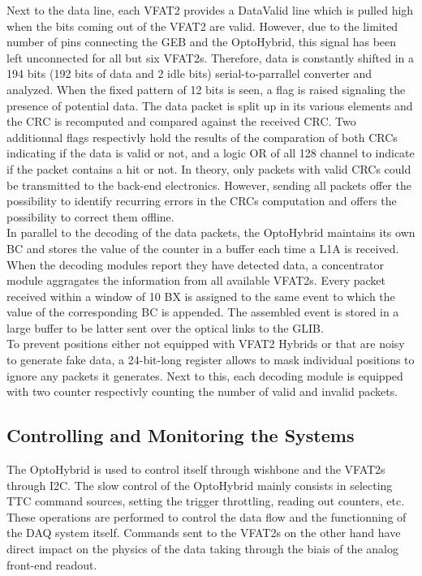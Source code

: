       Next to the data line, each VFAT2 provides a DataValid line which is pulled high when the bits coming out of the VFAT2 are valid. However, due to the limited number of pins connecting the GEB and the OptoHybrid, this signal has been left unconnected for all but six VFAT2s. Therefore, data is constantly shifted in a 194 bits (192 bits of data and 2 idle bits) serial-to-parrallel converter and analyzed. When the fixed pattern of 12 bits is seen, a flag is raised signaling the presence of potential data. The data packet is split up in its various elements and the CRC is recomputed and compared against the received CRC. Two additionnal flags respectivly hold the results of the comparation of both CRCs indicating if the data is valid or not, and a logic OR of all 128 channel to indicate if the packet contains a hit or not. In theory, only packets with valid CRCs could be transmitted to the back-end electronics. However, sending all packets offer the possibility to identify recurring errors in the CRCs computation and offers the possibility to correct them offline. \\

      In parallel to the decoding of the data packets, the OptoHybrid maintains its own BC and stores the value of the counter in a buffer each time a L1A is received. When the decoding modules report they have detected data, a concentrator module aggragates the information from all available VFAT2s. Every packet received within a window of 10 BX is assigned to the same event to which the value of the corresponding BC is appended. The assembled event is stored in a large buffer to be latter sent over the optical links to the GLIB. \\

      To prevent positions either not equipped with VFAT2 Hybrids or that are noisy to generate fake data, a 24-bit-long register allows to mask individual positions to ignore any packets it generates. Next to this, each decoding module is equipped with two counter respectivly counting the number of valid and invalid packets.

    \subsection{Controlling and Monitoring the Systems}

      The OptoHybrid is used to control itself through wishbone and the VFAT2s through I2C. The slow control of the OptoHybrid mainly consists in selecting TTC command sources, setting the trigger throttling, reading out counters, etc. These operations are performed to control the data flow and the functionning of the DAQ system itself. Commands sent to the VFAT2s on the other hand have direct impact on the physics of the data taking through the biais of the analog front-end readout. \\

